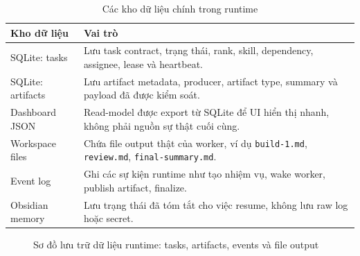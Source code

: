 \documentclass[12pt,a4paper]{article}
\begin{document}
\begin{table}[H]
\centering
\caption{Các kho dữ liệu chính trong runtime}
\begin{tabular}{p{}p{}}
\toprule
\textbf{Kho dữ liệu} & \textbf{Vai trò} \\
\midrule
SQLite: tasks & Lưu task contract, trạng thái, rank, skill, dependency, assignee, lease và heartbeat. \\
SQLite: artifacts & Lưu artifact metadata, producer, artifact type, summary và payload đã được kiểm soát. \\
Dashboard JSON & Read-model được export từ SQLite để UI hiển thị nhanh, không phải nguồn sự thật cuối cùng. \\
Workspace files & Chứa file output thật của worker, ví dụ \texttt{build-1.md}, \texttt{review.md}, \texttt{final-summary.md}. \\
Event log & Ghi các sự kiện runtime như tạo nhiệm vụ, wake worker, publish artifact, finalize. \\
Obsidian memory & Lưu trạng thái đã tóm tắt cho việc resume, không lưu raw log hoặc secret. \\
\bottomrule
\end{tabular}
\end{table}

\begin{figure}[H]
    \centering
    \caption{Sơ đồ lưu trữ dữ liệu runtime: tasks, artifacts, events và file output}
\end{figure}
\end{document}
